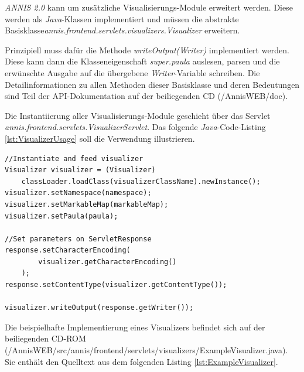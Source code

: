 \emph{ANNIS 2.0} kann um zusätzliche Visualisierungs-Module erweitert werden. Diese werden als \emph{Java}-Klassen implementiert und müssen die abstrakte Basisklasse\newline \emph{annis.frontend.servlets.visualizers.Visualizer} erweitern. 

Prinzipiell muss dafür die Methode \emph{writeOutput(Writer)} implementiert werden. Diese kann dann die Klasseneigenschaft \emph{super.paula} auslesen, parsen und die erwünschte Ausgabe auf die übergebene \emph{Writer}-Variable schreiben. Die Detailinformationen zu allen Methoden dieser Basisklasse und deren Bedeutungen sind Teil der API-Dokumentation auf der beiliegenden CD (/AnnisWEB/doc).

Die Instantiierung aller Visualisierungs-Module geschieht über das  Servlet \\\emph{annis.frontend.servlets.VisualizerServlet}. Das folgende \emph{Java}-Code-Listing \ref{lst:VisualizerUsage} soll die Verwendung illustrieren.\\


\begin{lstlisting}
//Instantiate and feed visualizer
Visualizer visualizer = (Visualizer) 
	classLoader.loadClass(visualizerClassName).newInstance();
visualizer.setNamespace(namespace);
visualizer.setMarkableMap(markableMap);
visualizer.setPaula(paula);

//Set parameters on ServletResponse			
response.setCharacterEncoding(
		visualizer.getCharacterEncoding()
	);
response.setContentType(visualizer.getContentType()); 
    
visualizer.writeOutput(response.getWriter());
\end{lstlisting}

Die beispielhafte Implementierung eines Visualizers befindet sich auf der beiliegenden CD-ROM (/AnnisWEB/src/annis/frontend/servlets/visualizers/ExampleVisualizer.java). Sie enthält den Quelltext aus dem folgenden Listing \ref{lst:ExampleVisualizer}.\\



